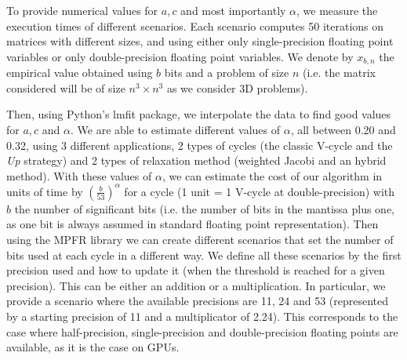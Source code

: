    To provide numerical values for $a,c$ and most importantly $\alpha$, we measure the execution times of different scenarios. Each scenario computes 50 iterations on matrices with different sizes, and using
   either only single-precision floating point variables or only double-precision floating point variables. We denote by $x_{b,n}$ the empirical value obtained using $b$ bits and a problem of size $n$ (i.e. the matrix
   considered will be of size $n^3 \times n^3$ as we consider 3D problems). %
   
   Then, using Python's lmfit package, we interpolate the data to find good values for $a,c$ and $\alpha$. We are able to estimate different values of $\alpha$, all between 0.20 and 0.32, using 3
   different applications, 2 types of cycles (the classic V-cycle and the \emph{Up} strategy) and 2 types of relaxation method (weighted Jacobi and an hybrid method).
   With these values of $\alpha$, we can estimate the cost of our algorithm in units of time by $\left(\frac{b}{53}\right)^\alpha$ for a cycle (1 unit = 1 V-cycle at double-precision) with $b$ the number of significant
   bits (i.e. the number of bits in the mantissa plus one, as one bit is always assumed in standard floating point representation). Then using the MPFR library we can create different
   scenarios that set the number of bits used at each cycle in a different way. We define all these scenarios by the first precision used and how to update it (when the threshold is reached for a given precision).
   This can be either an addition or a multiplication. In particular, we provide a scenario where the available precisions are 11, 24 and 53 (represented by a starting precision of 11 and a multiplicator of 2.24). This
   corresponds to the case where half-precision, single-precision and double-precision floating points are available, as it is the case on GPUs.
   
